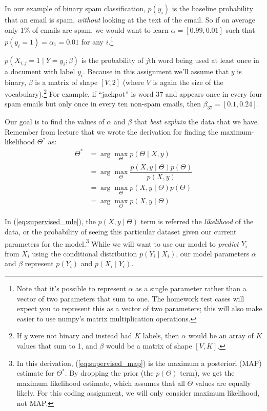 \documentclass[12pt]{article}
\begin{document}
In our example of binary spam classification, $p(y_i)$ is the baseline
probability that an email is spam, {\it without} looking at the text of the
email. So if on average only 1\% of emails are spam, we would want to learn
$\alpha = [0.99, 0.01]$ such that $p(y_i=1) = \alpha_1 = 0.01$ for any
$i$.\footnote{Note that it's possible to represent $\alpha$ as a single
parameter rather than a vector of two parameters that sum to one. The homework
test cases will expect you to represent this as a vector of two parameters;
this will also make easier to use numpy's matrix multiplication operations.}

$p(X_{i, j}=1 \mid Y=y_i; \beta)$ is the probability of $j$th word being
used at least once in a document with label $y_i$. Because in this assignment
we'll assume that $y$ is binary, $\beta$ is a matrix of shape $[V, 2]$ (where
$V$ is again the
size of the vocabulary).\footnote{If $y$ were not binary and instead
had $K$ labels, then $\alpha$ would be an array of $K$ values that sum to 1, and
$\beta$ would be a matrix of shape $[V, K]$.}
For example, if ``jackpot'' is word 37 and appears once in every four
spam emails but only once in every ten non-spam emails, then $\beta_{37} = [0.1, 0.24]$.

Our goal is to find the values of $\alpha$ and $\beta$ that {\it best explain}
the data that we have. Remember from lecture that we wrote the derivation for
finding the maximum-likelihood $\Theta^*$ as:
\begin{align}
\Theta^* &= \arg\max_\Theta p(\Theta \mid X, y) \nonumber \\
&= \arg\max_\Theta \dfrac{p(X, y \mid \Theta)p(\Theta)}{p(X, y)} \nonumber \\
&= \arg\max_\Theta p(X, y \mid \Theta)p(\Theta) \label{eq:supervised_map} \\
&= \arg\max_\Theta p(X, y \mid \Theta) \label{eq:supervised_mle}
\end{align}

In (\ref{eq:supervised_mle}), the $p(X, y \mid \Theta)$ term is referred the
{\it likelihood} of the data, or the probability of seeing this particular
dataset given our current parameters for the model.\footnote{In this
derivation, (\ref{eq:supervised_map}) is the maximum a posteriori (MAP)
estimate for $\Theta^*$. By dropping the prior (the $p(\Theta)$ term),
we get the maximum likelihood estimate, which assumes that all $\Theta$
values are equally likely. For this coding assignment, we will only consider
maximum likelihood, not MAP.}
While we will want to
use our model to \emph{predict} $Y_i$ from $X_i$ using the conditional
distribution $p(Y_i \mid X_i)$, our model parameters $\alpha$ and $\beta$
represent $p(Y_i)$ and $p(X_i \mid Y_i)$.
\end{document}
